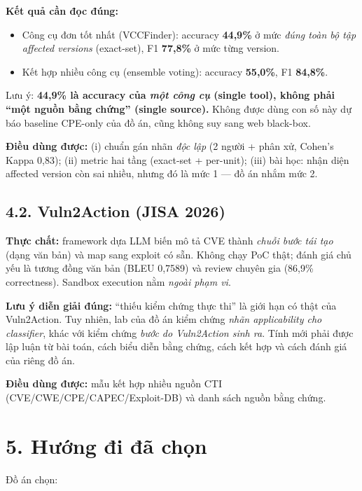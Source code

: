 \documentclass[11pt,a4paper]{article}
\begin{document}
\textbf{Kết quả cần đọc đúng:}
\begin{itemize}
  \item Công cụ đơn tốt nhất (VCCFinder): accuracy \textbf{44,9\%} ở mức \emph{đúng toàn bộ tập affected versions} (exact-set), F1 \textbf{77,8\%} ở mức từng version.
  \item Kết hợp nhiều công cụ (ensemble voting): accuracy \textbf{55,0\%}, F1 \textbf{84,8\%}.
\end{itemize}

Lưu ý: \textbf{44,9\% là accuracy của \emph{một công cụ} (single tool), không phải ``một nguồn bằng chứng'' (single source).} Không được dùng con số này dự báo baseline CPE-only của đồ án, cũng không suy sang web black-box.

\textbf{Điều dùng được:} (i) chuẩn gán nhãn \emph{độc lập} (2 người + phân xử, Cohen's Kappa 0,83); (ii) metric hai tầng (exact-set + per-unit); (iii) bài học: nhận diện affected version còn sai nhiều, nhưng đó là mức 1 — đồ án nhắm mức 2.

\subsection*{4.2. Vuln2Action (JISA 2026) \cite{vuln2action}}

\textbf{Thực chất:} framework dựa LLM biến mô tả CVE thành \emph{chuỗi bước tái tạo} (dạng văn bản) và map sang exploit có sẵn. Không chạy PoC thật; đánh giá chủ yếu là tương đồng văn bản (BLEU 0,7589) và review chuyên gia (86,9\% correctness). Sandbox execution nằm \emph{ngoài phạm vi}.

\textbf{Lưu ý diễn giải đúng:} ``thiếu kiểm chứng thực thi'' là giới hạn có thật của Vuln2Action. Tuy nhiên, lab của đồ án kiểm chứng \emph{nhãn applicability cho classifier}, khác với kiểm chứng \emph{bước do Vuln2Action sinh ra}. Tính mới phải được lập luận từ bài toán, cách biểu diễn bằng chứng, cách kết hợp và cách đánh giá của riêng đồ án.

\textbf{Điều dùng được:} mẫu kết hợp nhiều nguồn CTI (CVE/CWE/CPE/CAPEC/Exploit-DB) và danh sách nguồn bằng chứng.

\section*{5. Hướng đi đã chọn}

Đồ án chọn:
\end{document}
